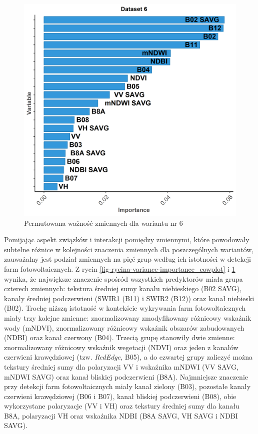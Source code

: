 \documentclass{amuthesis}
\begin{document}
\begin{figure}[t]

{\centering \includegraphics[width=4.6875in,height=\textheight]{figures/importance_plot_dataset6.png}

}

\caption{\label{fig-rycina-variance-importance-dataset6}Permutowana
ważność zmiennych dla wariantu nr 6}

\end{figure}

Pomijając aspekt związków i interakcji pomiędzy zmiennymi, które
powodowały subtelne różnice w kolejności znaczenia zmiennych dla
poszczególnych wariantów, zauważalny jest podział zmiennych na pięć grup
według ich istotności w detekcji farm fotowoltaicznych. Z rycin
\ref{fig-rycina-variance-importance_cowplot} i
\ref{fig-rycina-variance-importance-dataset6} wynika, że największe
znaczenie spośród wszystkich predyktorów miała grupa czterech zmiennych:
tekstura średniej sumy kanału niebieskiego (B02 SAVG), kanały średniej
podczerwieni (SWIR1 (B11) i SWIR2 (B12)) oraz kanał niebieski (B02).
Trochę niższą istotność w kontekście wykrywania farm fotowoltaicznych
miały trzy kolejne zmienne: znormalizowany zmodyfikowany różnicowy
wskaźnik wody (mNDVI), znormalizowany różnicowy wskaźnik obszarów
zabudowanych (NDBI) oraz kanał czerwony (B04). Trzecią grupę stanowiły
dwie zmienne: znormalizowany różnicowy wskaźnik wegetacji (NDVI) oraz
jeden z kanałów czerwieni krawędziowej (tzw. \emph{RedEdge}, B05), a do
czwartej grupy zaliczyć można tekstury średniej sumy dla polaryzacji VV
i wskaźnika mNDWI (VV SAVG, mNDWI SAVG) oraz kanał bliskiej podczerwieni
(B8A). Najmniejsze znaczenie przy detekcji farm fotowoltaicznych miały
kanał zielony (B03), pozostałe kanały czerwieni krawędziowej (B06 i
B07), kanał bliskiej podczerwieni (B08), obie wykorzystane polaryzacje
(VV i VH) oraz tekstury średniej sumy dla kanału B8A, polaryzacji VH
oraz wskaźnika NDBI (B8A SAVG, VH SAVG i NDBI SAVG).
\end{document}
